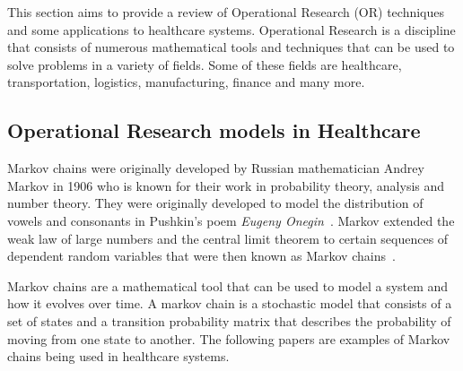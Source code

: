 This section aims to provide a review of Operational Research (OR) techniques
and some applications to healthcare systems.
Operational Research is a discipline that consists of numerous mathematical
tools and techniques that can be used to solve problems in a variety of
fields.
Some of these fields are healthcare, transportation, logistics, manufacturing,
finance and many more.


\subsection{Operational Research models in Healthcare}

Markov chains were originally developed by Russian mathematician Andrey Markov
in 1906 who is known for their work in probability theory, analysis and number
theory.
They were originally developed to model the distribution of vowels and
consonants in Pushkin's poem \textit{Eugeny Onegin}~\cite{pushkin2003eugene}.
Markov extended the weak law of large numbers and the central limit theorem to
certain sequences of dependent random variables that were then known as
Markov chains~\cite{Markov_life_and_work}.

Markov chains are a mathematical tool that can be used to model a system and
how it evolves over time.
A markov chain is a stochastic model that consists of a set of states and a
transition probability matrix that describes the probability of moving from one
state to another.
The following papers are examples of Markov chains being used in healthcare
systems.

